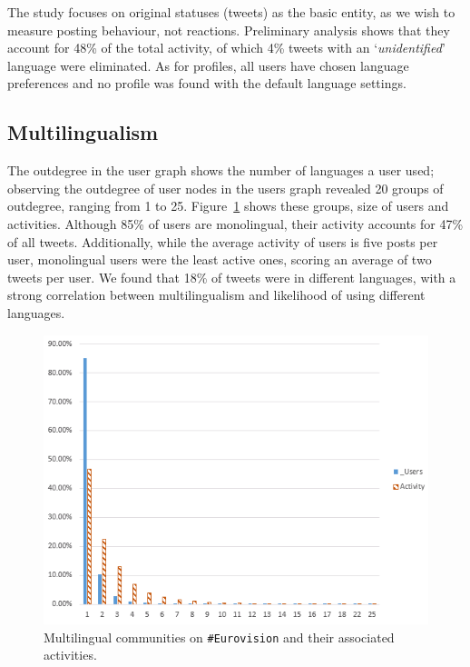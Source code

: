 \documentclass{llncs}
\begin{document}

The study focuses on original statuses (tweets) as the basic entity,
as we wish to measure posting behaviour, not reactions. Preliminary
analysis shows that they account for 48\% of the total activity, of
which 4\% tweets with an `{\emph{unidentified}}' language were
eliminated. As for profiles, all users have chosen language
preferences and no profile was found with the default language
settings.


\subsection{Multilingualism}

The outdegree in the user graph shows the number of languages a user
used; observing the outdegree of user nodes in the users graph revealed 20
groups of outdegree, ranging from 1 to
25. Figure~\ref{fig:multilingual} shows these groups, size of users
and activities. Although 85\% of users are monolingual, their
activity accounts for 47\% of all tweets. Additionally, while the
average activity of users is five posts per user, monolingual users
were the least active ones, scoring an average of two tweets per
user. We found that 18\% of tweets were in different languages, with a
strong correlation between multilingualism and likelihood of using
different languages.

\begin{figure}[htb]
\centering
\includegraphics[width=0.8\columnwidth]{images/multilingualcommunities.png}
\caption{Multilingual communities on {\texttt{\#Eurovision}} and their associated activities.}
\label{fig:multilingual}
\end{figure}
\end{document}
